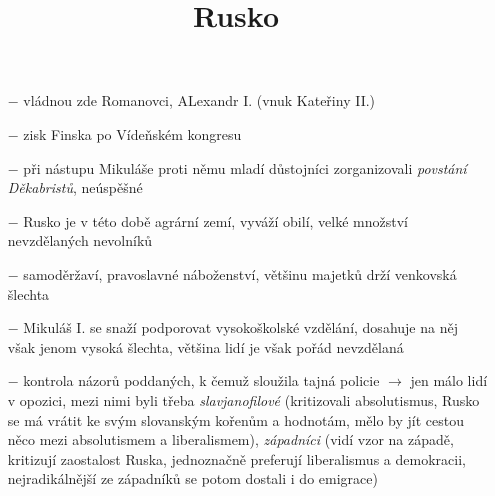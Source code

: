 \documentclass{article}
\title{\vspace{-2cm}Rusko\vspace{-1.7cm}}
\date{}
\author{}
\begin{document}
\maketitle

\begin{itemize}
    \vspace{-0.5em}
    \setlength\itemsep{0.15em}
    \item[$-$] vládnou zde Romanovci, ALexandr I. (vnuk Kateřiny II.)
    \item[$-$] zisk Finska po Vídeňském kongresu
    \item[$-$] při nástupu Mikuláše proti němu mladí důstojníci zorganizovali \textit{povstání Děkabristů}, neúspěšné
    \item[$-$] Rusko je v této době agrární zemí, vyváží obilí, velké množství nevzdělaných nevolníků
    \item[$-$] samoděržaví, pravoslavné náboženství, většinu majetků drží venkovská šlechta
    \item[$-$] Mikuláš I. se snaží podporovat vysokoškolské vzdělání, dosahuje na něj však jenom vysoká šlechta, většina lidí je však pořád nevzdělaná
    \item[$-$] kontrola názorů poddaných, k čemuž sloužila tajná policie $\rightarrow$ jen málo lidí v opozici, mezi nimi byli třeba \textit{slavjanofilové} (kritizovali absolutismus, Rusko se má vrátit ke svým slovanským kořenům a hodnotám, mělo by jít cestou něco mezi absolutismem a liberalismem), \textit{západníci} (vidí vzor na západě, kritizují zaostalost Ruska, jednoznačně preferují liberalismus a demokracii, nejradikálnější ze západníků se potom dostali i do emigrace)


\end{itemize}
\end{document}
